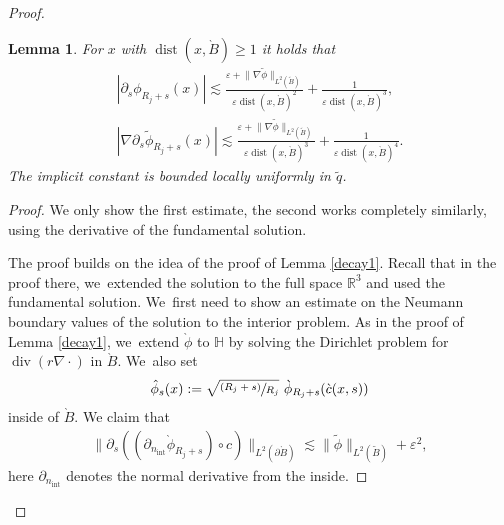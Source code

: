 \documentclass[JEP,XML,SOM,Unicode,published]{cedram}
\let\epsilon\varepsilon
\newcommand{\psfrac}[2]{\sfrac{(#1)}{#2}}
\newtheorem{lemma}[theorem]{Lemma}
\theoremstyle{definition}
\renewcommand{\div}{\operatorname{div}}
\DeclareMathOperator{\dist}{dist}
\newcommand\R{\mathbb{R}}
\newcommand\anorm[1]{\lVert #1\rVert}
\newcommand\bnorm[1]{\bigl\lVert #1\bigr\rVert}
\let\de\partial
\let\eps\epsilon
\begin{document}
\begin{proof}
\begin{lemma}\label{Decay deri}
For $x$ with $\dist(x,\grave{B})\geq 1$ it holds that
\begin{align*}
|\de_s\phi_{R_j+s}(x)|\lesssim \frac{\eps+\anorm{\nabla\tilde{\phi}}_{L^2(\tilde{B})}}{\eps\dist(x,\grave{B})^2}+\frac{1}{\eps\dist(x,\grave{B})^3},
\\
\tag*{and}
|\nabla\de_s\tilde{\phi}_{R_j+s}(x)|\lesssim \frac{\eps+\anorm{\nabla\tilde{\phi}}_{L^2(\tilde{B})}}{\eps\dist(x,\grave{B})^3}+\frac{1}{\eps\dist(x,\grave{B})^4}.
\end{align*}
The implicit constant is bounded locally uniformly in $\tilde{q}$.

\end{lemma}
\begin{proof}
We only show the first estimate, the second works completely similarly, using the derivative of the fundamental solution.

The proof builds on the idea of the proof of Lemma \ref{decay1}. Recall that in the proof there, we~extended the solution to the full space $\R^3$ and used the fundamental solution. We~first need to show an estimate on the Neumann boundary values of the solution to the interior problem. As in the proof of Lemma \ref{decay1}, we~extend $\grave{\phi}$ to $\mathbb{H}$ by solving the Dirichlet problem for $\div(r\nabla\cdot)$ in $\grave{B}$. We~also set
\begin{align*}
\hat{\phi}_s(x):=\sqrt{\psfrac{R_j+s}{R_j}}\,\,\grave{\phi}_{R_j+s}(\grave{c}(x,s))
\end{align*}
inside of $\grave{B}$.
We claim that
\begin{align}
\bnorm{\de_s((\de_{n_\mathrm{int}}\grave{\phi}_{R_j+s})\circ c)}_{L^2(\de\grave{B})}\lesssim \bnorm{\tilde{\phi}}_{L^2(\tilde{B})}+\eps^2,\label{inner bd}
\end{align}
here $\de_{n_\mathrm{int}}$ denotes the normal derivative from the inside.


\end{proof}
\end{proof}
\end{document}
